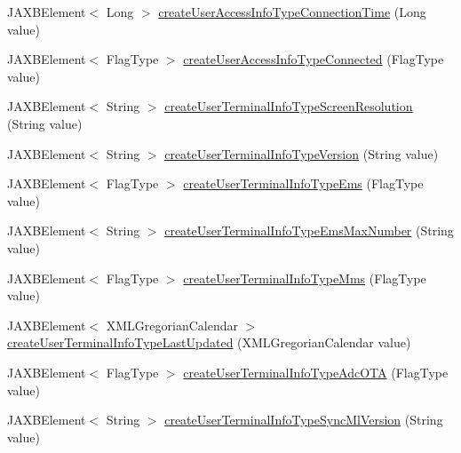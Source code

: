 \begin{DoxyCompactItemize}
\item 
JAXBElement$<$ Long $>$ \hyperlink{classcom_1_1telefonica_1_1schemas_1_1unica_1_1rest_1_1directory_1_1v1_1_1ObjectFactory_a6ab793fd523a2d14c800dd7c7e04300e}{createUserAccessInfoTypeConnectionTime} (Long value)
\item 
JAXBElement$<$ FlagType $>$ \hyperlink{classcom_1_1telefonica_1_1schemas_1_1unica_1_1rest_1_1directory_1_1v1_1_1ObjectFactory_ab8227c08495451eac8dbb20a6966a5ee}{createUserAccessInfoTypeConnected} (FlagType value)
\item 
JAXBElement$<$ String $>$ \hyperlink{classcom_1_1telefonica_1_1schemas_1_1unica_1_1rest_1_1directory_1_1v1_1_1ObjectFactory_aea7624669dd1044ba6b0c90c0105b789}{createUserTerminalInfoTypeScreenResolution} (String value)
\item 
JAXBElement$<$ String $>$ \hyperlink{classcom_1_1telefonica_1_1schemas_1_1unica_1_1rest_1_1directory_1_1v1_1_1ObjectFactory_a1268a5c5ed666f9f3330655216309875}{createUserTerminalInfoTypeVersion} (String value)
\item 
JAXBElement$<$ FlagType $>$ \hyperlink{classcom_1_1telefonica_1_1schemas_1_1unica_1_1rest_1_1directory_1_1v1_1_1ObjectFactory_a5bfaec6baf1f50a691611680b439addb}{createUserTerminalInfoTypeEms} (FlagType value)
\item 
JAXBElement$<$ String $>$ \hyperlink{classcom_1_1telefonica_1_1schemas_1_1unica_1_1rest_1_1directory_1_1v1_1_1ObjectFactory_a2de22bc35ceae50f66d9e3d957413c5b}{createUserTerminalInfoTypeEmsMaxNumber} (String value)
\item 
JAXBElement$<$ FlagType $>$ \hyperlink{classcom_1_1telefonica_1_1schemas_1_1unica_1_1rest_1_1directory_1_1v1_1_1ObjectFactory_a179bc81fa02c1f5f015cde1bd244bc26}{createUserTerminalInfoTypeMms} (FlagType value)
\item 
JAXBElement$<$ XMLGregorianCalendar $>$ \hyperlink{classcom_1_1telefonica_1_1schemas_1_1unica_1_1rest_1_1directory_1_1v1_1_1ObjectFactory_a8e889e4ee8ced3d250f15cd2a847990d}{createUserTerminalInfoTypeLastUpdated} (XMLGregorianCalendar value)
\item 
JAXBElement$<$ FlagType $>$ \hyperlink{classcom_1_1telefonica_1_1schemas_1_1unica_1_1rest_1_1directory_1_1v1_1_1ObjectFactory_a153fcff9508b48ad9061ea9f0ce0d53e}{createUserTerminalInfoTypeAdcOTA} (FlagType value)
\item 
JAXBElement$<$ String $>$ \hyperlink{classcom_1_1telefonica_1_1schemas_1_1unica_1_1rest_1_1directory_1_1v1_1_1ObjectFactory_ab2ab3f5a362f903db1d462ee49b508d4}{createUserTerminalInfoTypeSyncMlVersion} (String value)

\end{DoxyCompactItemize}
